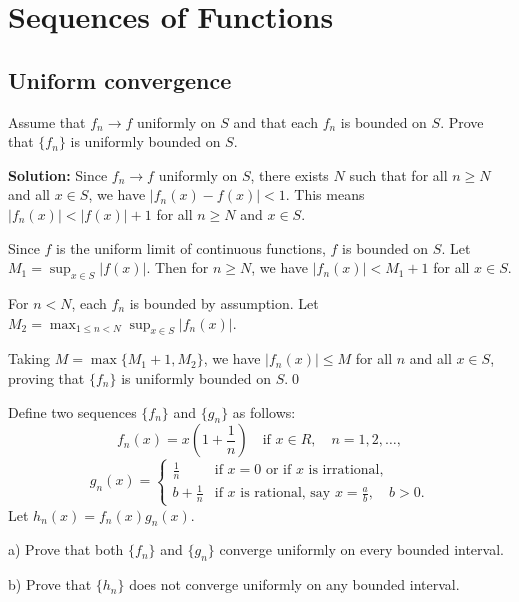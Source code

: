 \chapter{Sequences of Functions}

\section{Uniform convergence}



\begin{problembox}
Assume that \( f_n \to f \) uniformly on \( S \) and that each \( f_n \) is bounded on \( S \). Prove that \(\{f_n\}\) is uniformly bounded on \( S \).
\end{problembox}

\bigskip\noindent\textbf{Solution:} Since \( f_n \to f \) uniformly on \( S \), there exists \( N \) such that for all \( n \geq N \) and all \( x \in S \), we have \( |f_n(x) - f(x)| < 1 \). This means \( |f_n(x)| < |f(x)| + 1 \) for all \( n \geq N \) and \( x \in S \).

Since \( f \) is the uniform limit of continuous functions, \( f \) is bounded on \( S \). Let \( M_1 = \sup_{x \in S} |f(x)| \). Then for \( n \geq N \), we have \( |f_n(x)| < M_1 + 1 \) for all \( x \in S \).

For \( n < N \), each \( f_n \) is bounded by assumption. Let \( M_2 = \max_{1 \leq n < N} \sup_{x \in S} |f_n(x)| \).

Taking \( M = \max\{M_1 + 1, M_2\} \), we have \( |f_n(x)| \leq M \) for all \( n \) and all \( x \in S \), proving that \(\{f_n\}\) is uniformly bounded on \( S \).\qed


\begin{problembox}
Define two sequences \(\{f_n\}\) and \(\{g_n\}\) as follows:
\[f_n(x) = x \left( 1 + \frac{1}{n} \right) \quad \text{if } x \in R, \quad n = 1, 2, \ldots,\]
\[g_n(x) = 
\begin{cases}
\frac{1}{n} & \text{if } x = 0 \text{ or if } x \text{ is irrational,} \\
b + \frac{1}{n} & \text{if } x \text{ is rational, say } x = \frac{a}{b}, \quad b > 0.
\end{cases}\]
Let \( h_n(x) = f_n(x) g_n(x) \).

a) Prove that both \(\{f_n\}\) and \(\{g_n\}\) converge uniformly on every bounded interval.

b) Prove that \(\{h_n\}\) does not converge uniformly on any bounded interval.
\end{problembox}

